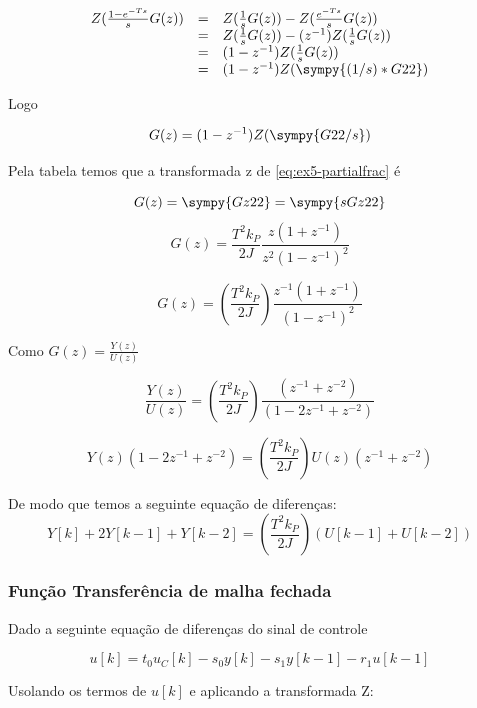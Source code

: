 \documentclass[a4paper,11pt]{article}
\begin{document}
$$
\begin{array}{lcl}
    Z(\frac{1-e^{-Ts}}{s}G(z)) &=& Z(\frac{1}{s}G(z)) - Z(\frac{e^{-Ts}}{s}G(z))\\
    &=& Z(\frac{1}{s}G(z)) - (z^{-1})Z(\frac{1}{s}G(z))\\
    &=& (1 - z^{-1})Z(\frac{1}{s}G(z))\\
    &=& (1 - z^{-1})Z(\sympy{(1/s)*G22})\\
\end{array}
$$

Logo

\begin{equation}\label{eq:ex5-partialfrac}
 G(z) =   (1 - z^{-1})Z(\sympy{G22/s})
\end{equation}

Pela tabela temos que a transformada z de \ref{eq:ex5-partialfrac} é

$$G(z) = \sympy{Gz22} = \sympy{sGz22}$$
$$G(z) = \frac{T^2 k_{P}}{2J}\frac{z(1+z^{-1})}{z^2(1-z^{-1})^2}$$

\begin{equation}
    G(z) =\left(\frac{T^2 k_{P}}{2J}\right)\frac{z^{-1}(1+z^{-1})}{(1-z^{-1})^2}
\end{equation}

Como $G(z) = \frac{Y(z)}{U(z)}$

$$
\frac{Y(z)}{U(z)} =\left(\frac{T^2 k_{P}}{2J}\right)\frac{(z^{-1} + z^{-2})}{(1 - 2 z^{-1} + z^{-2})}
$$

$$
 Y(z)\left(1 - 2 z^{-1} + z^{-2}\right)
 = \left(\frac{T^2 k_{P}}{2J}\right)U(z)\left(z^{-1} + z^{-2}\right)
$$

De modo que temos a seguinte equação de diferenças:
\begin{equation}
 Y[k] +  2Y[k -1] +  Y[k - 2]
 = \left(\frac{T^2 k_{P}}{2J}\right)\left(U[k -1] +  U[k - 2]\right)
\end{equation}

\subsubsection{Função Transferência de malha fechada}

Dado a seguinte equação de diferenças do sinal de controle

\begin{equation}
    u[k] = t_0 u_C[k] - s_0 y[k] - s_1 y[k-1] - r_1 u[k -1]
\end{equation}

Usolando os termos de $u[k]$ e aplicando a transformada Z:
\end{document}
